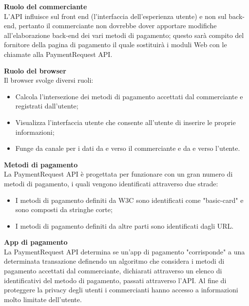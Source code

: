 \documentclass[11pt ,a4paper , twoside , openright ]{article}
\begin{document}
\textbf{Ruolo del commerciante}
\\
L'API influisce sul front end (l'interfaccia dell'esperienza utente) e non sul back-end, pertanto il commerciante non dovrebbe dover apportare modifiche all'elaborazione back-end dei vari metodi di pagamento; questo sarà compito del fornitore della pagina di pagamento il quale sostituirà i moduli Web con le chiamate alla PaymentRequest API.

\textbf{Ruolo del browser}
\\
Il browser svolge diversi ruoli:
\begin{itemize}
	\item Calcola l'intersezione dei metodi di pagamento accettati dal commerciante e registrati dall'utente;
	\item Visualizza l'interfaccia utente che consente all'utente di inserire le proprie informazioni;
	\item Funge da canale per i dati da e verso il commerciante e da e verso l'utente.
\end{itemize}

\textbf{Metodi di pagamento}
\\
La PaymentRequest API è progettata per funzionare con un gran numero di metodi di pagamento, i quali vengono identificati attraverso due strade:
\begin{itemize}
	\item I metodi di pagamento definiti da W3C sono identificati come "basic-card" e sono composti da stringhe corte;
	\item I metodi di pagamento definiti da altre parti sono identificati dagli URL.
\end{itemize}

\textbf{App di pagamento}
\\
La PaymentRequest API determina se un'app di pagamento "corrisponde" a una determinata transazione definendo un algoritmo che considera i metodi di pagamento accettati dal commerciante, dichiarati attraverso un elenco di identificativi del metodo di pagamento, passati attraverso l'API.
Al fine di proteggere la privacy degli utenti i commercianti hanno accesso a informazioni molto limitate dell'utente. 
\end{document}
